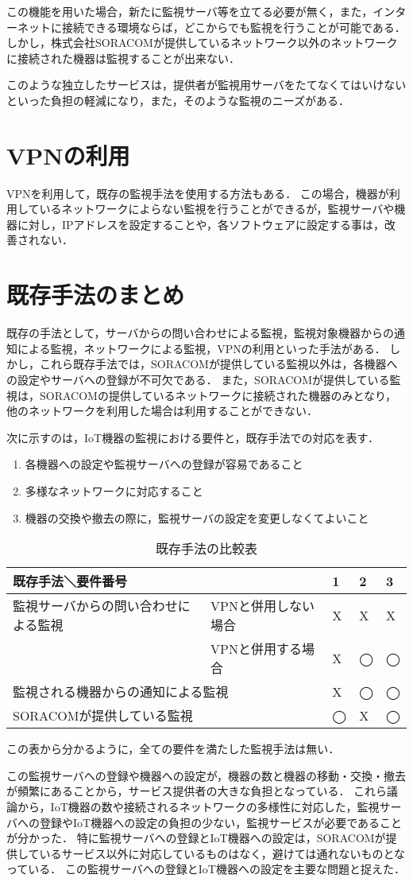 	この機能を用いた場合，新たに監視サーバ等を立てる必要が無く，また，インターネットに接続できる環境ならば，どこからでも監視を行うことが可能である．
	しかし，株式会社SORACOMが提供しているネットワーク以外のネットワークに接続された機器は監視することが出来ない．

	このような独立したサービスは，提供者が監視用サーバをたてなくてはいけないといった負担の軽減になり，また，そのような監視のニーズがある．

\section{VPNの利用}
	VPNを利用して，既存の監視手法を使用する方法もある．
	この場合，機器が利用しているネットワークによらない監視を行うことができるが，監視サーバや機器に対し，IPアドレスを設定することや，各ソフトウェアに設定する事は，改善されない．

\section{既存手法のまとめ}
	既存の手法として，サーバからの問い合わせによる監視，監視対象機器からの通知による監視，ネットワークによる監視，VPNの利用といった手法がある．
	しかし，これら既存手法では，SORACOMが提供している監視以外は，各機器への設定やサーバへの登録が不可欠である．
	また，SORACOMが提供している監視は，SORACOMの提供しているネットワークに接続された機器のみとなり，他のネットワークを利用した場合は利用することができない．

	次に示すのは，IoT機器の監視における要件と，既存手法での対応を表す．
	\begin{enumerate}
		\item 各機器への設定や監視サーバへの登録が容易であること
		\item 多様なネットワークに対応すること
		\item 機器の交換や撤去の際に，監視サーバの設定を変更しなくてよいこと
	\end{enumerate}
	\begin{table}[htbp]
	\caption{既存手法の比較表}
	\begin{tabular}{|l|l|l|l|l|} \hline
		\multicolumn{2}{|l|}{既存手法＼要件番号} & 1 & 2 & 3 \\ \hline \hline
		監視サーバからの問い合わせによる監視 & VPNと併用しない場合 & X & X & X \\ \cline{2-5}
			& VPNと併用する場合 & X & ◯ & ◯  \\ \hline
		\multicolumn{2}{|l|}{監視される機器からの通知による監視} & X & ◯ & ◯ \\ \hline
		\multicolumn{2}{|l|}{SORACOMが提供している監視} & ◯ & X & ◯ \\ \hline
	\end{tabular}
	\end{table}
	この表から分かるように，全ての要件を満たした監視手法は無い．

	この監視サーバへの登録や機器への設定が，機器の数と機器の移動・交換・撤去が頻繁にあることから，サービス提供者の大きな負担となっている．
	これら議論から，IoT機器の数や接続されるネットワークの多様性に対応した，監視サーバへの登録やIoT機器への設定の負担の少ない，監視サービスが必要であることが分かった．
	特に監視サーバへの登録とIoT機器への設定は，SORACOMが提供しているサービス以外に対応しているものはなく，避けては通れないものとなっている．
	この監視サーバへの登録とIoT機器への設定を主要な問題と捉えた．


